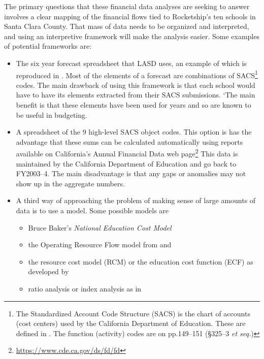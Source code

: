 The primary questions that these financial data analyses are seeking to answer involves a clear mapping of the financial flows tied to Rocketship's ten schools in Santa Clara County. That mass of data needs to be organized and interpreted, and using an interpretive framework will make the analysis easier. Some examples of potential frameworks are:

\begin{itemize}
  \item The six year forecast spreadsheet that LASD uses, an example of which is reproduced in . Most of the elements of a forecast are combinations of SACS\footnote{The Standardized Account Code Structure (SACS) is the chart of accounts (cost centers) used by the California Department of Education. These are defined in . The function (activity) codes are on pp.149–151 (§325–3 \textit{et seq.})} codes. The main drawback of using this framework is that each school would have to have its elements extracted from their SACS submissions. `The main benefit is that these elements have been used for years and so are known to be useful in budgeting.
  \item A spreadsheet of the 9 high-level SACS object codes. This option is has the advantage that these sums can be calculated automatically using reports available on California's Annual Financial Data web page\footnote{\url{https://www.cde.ca.gov/ds/fd/fd}} This data is maintained by the California Department of Education and go back to FY2003–4. The main disadvantage is that any gaps or anomalies may not show up in the aggregate numbers.
  \item A third way of approaching the problem of making sense of large amounts of data is to use a model. Some possible models are

  \begin{itemize}
    \item Bruce Baker's \textit{National Education Cost Model} \parencite[5]{Baker.etal2018}
    \item the Operating Resource Flow model from \textcite[16]{Baker.Miron2015} and 
    \item the resource cost model (RCM) or the education cost function (ECF) as developed by \textcite[188–197]{Baker2018a}
    \item ratio analysis or index analysis as in \textcite[70–86]{Baker.Richards2004} 
  \end{itemize}

\end{itemize}%

